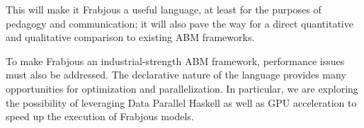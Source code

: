 \documentclass[oribibl]{llncs}
\begin{document}
 This will make it Frabjous a useful language, at least for the purposes of pedagogy and communication; it will also pave the way for a direct quantitative and qualitative comparison to existing ABM frameworks.

To make Frabjous an industrial-strength ABM framework, performance issues must also be addressed. The declarative nature of the language provides many opportunities for optimization and parallelization. In particular, we are exploring the possibility of leveraging Data Parallel Haskell\cite{dphaskell} as well as GPU acceleration\cite{accelerate} to speed up the execution of Frabjous models. 
   








%
\end{document}
